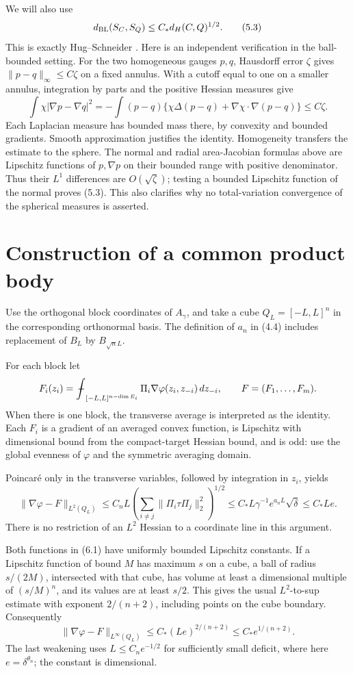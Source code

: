 \documentclass[11pt,reqno]{amsart}
\numberwithin{equation}{section}
\theoremstyle{remark}
\theoremstyle{definition}
\newcommand{\fint}{\mathop{\rlap{\hspace{0.15em}$-$}\!\int}\nolimits}
\begin{document}
We will also use
\[
d_{\rm BL}(S_C,S_Q)\le C_*d_H(C,Q)^{1/2}.               \tag{5.3}
\]
This is exactly Hug--Schneider \cite[(1.2)]{HS}. Here is an independent verification in the ball-bounded setting. For the two homogeneous gauges \(p,q\), Hausdorff error \(\zeta\) gives \(\|p-q\|_\infty\le C\zeta\) on a fixed annulus. With a cutoff equal to one on a smaller annulus, integration by parts and the positive Hessian measures give
\[
\int\chi|\nabla p-\nabla q|^2
=-\int(p-q)\{\chi\Delta(p-q)+\nabla\chi\cdot\nabla(p-q)\}
\le C\zeta.
\]
Each Laplacian measure has bounded mass there, by convexity and bounded gradients. Smooth approximation justifies the identity. Homogeneity transfers the estimate to the sphere. The normal and radial area-Jacobian formulas above are Lipschitz functions of \(p,\nabla p\) on their bounded range with positive denominator. Thus their \(L^1\) differences are \(O(\sqrt\zeta)\); testing a bounded Lipschitz function of the normal proves (5.3). This also clarifies why no total-variation convergence of the spherical measures is asserted.

\section{Construction of a common product body}

Use the orthogonal block coordinates of \(A_\gamma\), and take a cube \(Q_L=[-L,L]^n\) in the corresponding orthonormal basis. The definition of \(a_n\) in (4.4) includes replacement of \(B_L\) by \(B_{\sqrt n L}\).

For each block let
\[
F_i(z_i)=\fint_{[-L,L]^{n-\dim E_i}}
\Pi_i\nabla\varphi(z_i,z_{-i})\,dz_{-i},\qquad F=(F_1,\ldots,F_m).
\]
When there is one block, the transverse average is interpreted as the identity. Each \(F_i\) is a gradient of an averaged convex function, is Lipschitz with dimensional bound from the compact-target Hessian bound, and is odd: use the global evenness of \(\varphi\) and the symmetric averaging domain.

Poincar\'e only in the transverse variables, followed by integration in \(z_i\), yields
\[
\|\nabla\varphi-F\|_{L^2(Q_L)}
\le C_nL\left(\sum_{i\ne j}\|\Pi_i\tau\Pi_j\|_2^2\right)^{1/2}
\le C_*L\gamma^{-1}e^{a_nL}\sqrt\delta
\le C_*Le.                                             \tag{6.1}
\]
There is no restriction of an \(L^2\) Hessian to a coordinate line in this argument.

Both functions in (6.1) have uniformly bounded Lipschitz constants. If a Lipschitz function of bound \(M\) has maximum \(s\) on a cube, a ball of radius \(s/(2M)\), intersected with that cube, has volume at least a dimensional multiple of \((s/M)^n\), and its values are at least \(s/2\). This gives the usual \(L^2\)-to-sup estimate with exponent \(2/(n+2)\), including points on the cube boundary. Consequently
\[
\|\nabla\varphi-F\|_{L^\infty(Q_L)}
\le C_*(Le)^{2/(n+2)}
\le C_* e^{1/(n+2)}.                                   \tag{6.2}
\]
The last weakening uses \(L\le C_ne^{-1/2}\) for sufficiently small deficit, where here \(e=\delta^{\theta_n}\); the constant is dimensional.
\end{document}
